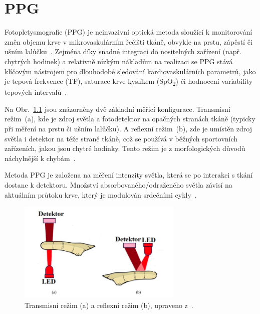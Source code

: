 \chapter{\acl{PPG}}
\label{chap:PPG_teorie}

Fotopletysmografie (\acs{PPG}) je neinvazivní optická metoda sloužící k monitorování změn objemu krve v mikrovaskulárním řečišti tkáně, obvykle na prstu, zápěstí či ušním lalůčku~\cite{Park2022}.
Zejména díky snadné integraci do nositelných zařízení (např. chytrých hodinek) a relativně nízkým nákladům na realizaci se \acs{PPG} stává klíčovým nástrojem pro dlouhodobé sledování kardiovaskulárních parametrů,
jako je tepová frekvence (\acs{TF}), saturace krve kyslíkem (SpO\textsubscript{2}) či hodnocení variability tepových intervalů~\cite{Orphanidou2018}.

Na Obr.~\ref{fig:snimaniPPG} jsou znázorněny dvě základní měřicí konfigurace.
Transmisní režim~(a), kde je zdroj světla a fotodetektor na opačných stranách tkáně (typicky při měření na prstu či ušním lalůčku).
A reflexní režim~(b), zde je umístěn zdroj světla i detektor na téže straně tkáně, což se používá v běžných sportovních zařízeních, jakou jsou chytré hodinky.
Tento režim je z morfologických důvodů náchylnější k chybám~\cite{Peralta2017}.

Metoda \acs{PPG} je založena na měření intenzity světla, která se po interakci s tkání dostane k detektoru.
Množství absorbovaného/odraženého světla závisí na aktuálním průtoku krve, který je modulován srdečními cykly~\cite{Park2022}.

\begin{figure}[h]
	\centering
	\includegraphics[width=0.7\textwidth]{./obrazky/snimaniPPG.png}
	\caption[Snímání PPG signálu]{Transmisní režim (a) a reflexní režim (b), upraveno z~\cite{ENIKÖ}.}
	\label{fig:snimaniPPG}
\end{figure}

